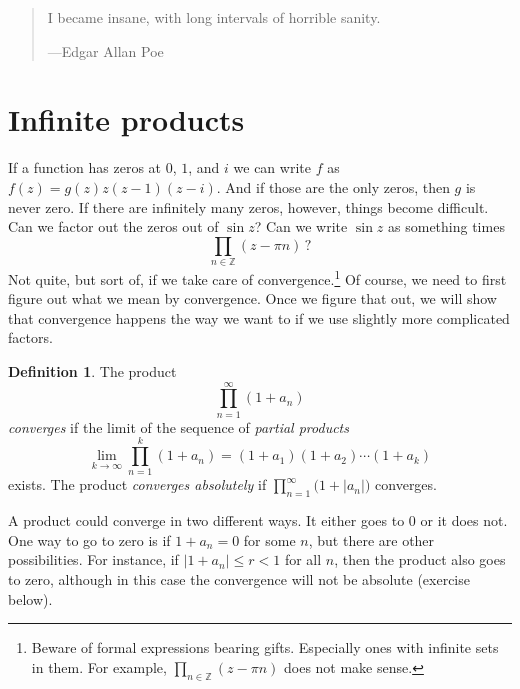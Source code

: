 \documentclass[12pt,openany]{book}
\newcommand{\sabs}[1]{\lvert {#1} \rvert}
\newcommand{\Z}{{\mathbb{Z}}}
\newcommand{\myindex}[1]{#1\index{#1}}
\theoremstyle{plain}
\theoremstyle{remark}
\theoremstyle{definition}
\newtheorem{defn}[thm]{Definition}
\newenvironment{myepigraph}{%
    \begin{quote}%
    \begingroup\itshape
}{%
    \endgroup%
    \end{quote}
}
\theoremstyle{exercise}
\theoremstyle{example}
\begin{document}
\begin{myepigraph}
I became insane, with long intervals of horrible sanity.

---Edgar Allan Poe
\end{myepigraph}


\section{Infinite products}
\label{sec:prod}

If a
function has zeros at $0$, $1$, and $i$ we
can write $f$ as
$f(z) = g(z) z(z-1)(z-i)$.  And if those are the only zeros, then 
$g$ is never zero.  If there are infinitely many zeros, however,
things become difficult.
Can we factor out the zeros out of $\sin z$?  Can we
write $\sin z$ as something times
\begin{equation*}
\prod_{n \in \Z} (z-\pi n) \, ?
\end{equation*}
Not quite, but sort of, if
we take care of convergence.\footnote{Beware of
formal expressions bearing gifts.
Especially ones with infinite sets in them.
For example, $\prod_{n \in \Z} (z-\pi n)$ does not make sense.}
Of course, we need to first
figure out what we mean by convergence.  Once we figure that out,
we will show that convergence happens the way we want to
if we use slightly more complicated factors.

\begin{defn}
The product
%
\begin{equation*}
\prod_{n=1}^\infty (1+a_n)
\end{equation*}
\emph{converges} if the limit of the
sequence of \emph{\myindex{partial products}}
\begin{equation*}
\lim_{k\to \infty}
\prod_{n=1}^k (1+a_n) = (1+a_1)(1+a_2) \cdots (1+a_k)
\end{equation*}
exists.
The product
\emph{converges absolutely}
if $\prod_{n=1}^\infty \bigl(1+\sabs{a_n}\bigr)$
converges.
\end{defn}

A product could converge in two different ways.  It either goes to 0 or it
does not.
One way to go to zero is if $1+a_n=0$ for some $n$, but there
are other possibilities.  For instance, if $\sabs{1+a_n} \leq r < 1$ for all
$n$, then the product also goes to zero, although in this case the
convergence will not be absolute (exercise below).
\end{document}
